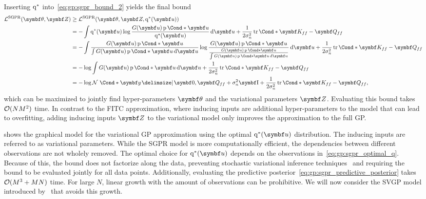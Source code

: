 Inserting $\operatorname{q}^\ast$ into~\cref{eq:gp:sgpr_bound_2} yields the final bound
\begin{equation}
    \begin{split}
        \label{eq:gp:sgpr_bound}
        \Lc^{\text{SGPR}}(\mat{\theta}, \mat{Z})
        &\geq \Lc^{\text{SGPR}}(\mat{\theta}, \mat{Z}, \q^\ast(\mat{u})) \\
        &= -\int \q^\ast(\mat{u}) \log\frac{G(\mat{u})\Prob*{\mat{u}}}{\q^\ast(\mat{u})} \diff \mat{u} + \frac{1}{2\sigma_n^2}\Fun*{\tr}{\mat{K_{ff}} - \mat{Q_{ff}}} \\
        &= -\int \frac{G(\mat{u}) \Prob*{\mat{u}}}{\int G(\mat{u}) \Prob*{\mat{u}} \diff \mat{u}} \log\frac{G(\mat{u})\Prob*{\mat{u}}}{\frac{G(\mat{u}) \Prob*{\mat{u}}}{\int G(\mat{u}) \Prob*{\mat{u}} \diff \mat{u}}} \diff \mat{u} + \frac{1}{2\sigma_n^2}\Fun*{\tr}{\mat{K_{ff}} - \mat{Q_{ff}}} \\
        &= -\log \int G(\mat{u}) \Prob*{\mat{u}} \diff \mat{u} + \frac{1}{2\sigma_n^2}\Fun*{\tr}{\mat{K_{ff}} - \mat{Q_{ff}}} \\
        &= -\log \Gaussian*{\mat{y} \given \mat{0}, \mat{Q_{ff}} + \sigma_n^2\Eye} + \frac{1}{2\sigma_n^2}\Fun*{\tr}{\mat{K_{ff}} - \mat{Q_{ff}}},
    \end{split}
\end{equation}
which can be maximized to jointly find hyper-parameters $\mat{\theta}$ and the variational parameters $\mat{Z}$.
Evaluating this bound takes $\operatorname{\mathcal{O}}(NM^2)$ time.
In contrast to the FITC approximation, where inducing inputs are additional hyper-parameters to the model that can lead to overfitting, adding inducing inputs $\mat{Z}$ to the variational model only improves the approximation to the full GP.

 shows the graphical model for the variational GP approximation using the optimal $\q^\ast(\mat{u})$ distribution.
The inducing inputs
are referred to as variational parameters.
While the SGPR model is more computationally efficient, the dependencies between different observations are not wholely removed.
The optimal choice for $\q^\ast(\mat{u})$ depends on the observations in~\cref{eq:gp:sgpr_optimal_q}.
Because of this, the bound does not factorize along the data, preventing stochastic variational inference techniques~\parencite{hensman_gaussian_2013} and requiring the bound to be evaluated jointly for all data points.
Additionally, evaluating the predictive posterior~\cref{eq:gp:sgpr_predictive_posterior} takes $\operatorname{\mathcal{O}}(M^3 + MN)$ time.
For large $N$, linear growth with the amount of observations can be prohibitive.
We will now consider the SVGP model introduced by~\textcite{hensman_gaussian_2013} that avoids this growth.

